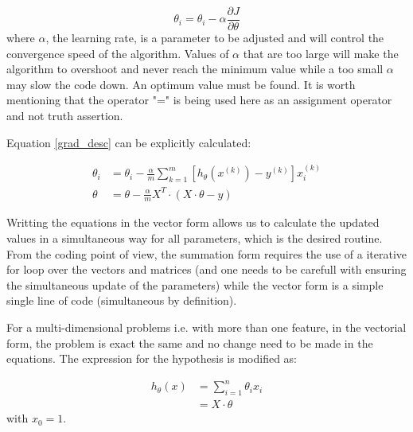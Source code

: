 \begin{equation} \label{grad_desc}
    \theta_{i} = \theta_{i} - \alpha \frac{\partial J}{\partial \theta}
\end{equation}
where $\alpha$, the learning rate, is a parameter to be adjusted and will control the convergence speed of the algorithm. 
Values of $\alpha$ that are too large will make the algorithm to overshoot and never reach the minimum
value while a too small $\alpha$ may slow the code down. An optimum value must be found. It is worth mentioning that the operator "="
is being used here as an assignment operator and not truth assertion.

Equation \ref{grad_desc} can be explicitly calculated:

\begin{equation}
    \begin{split}
        \theta_{i} & = \theta_{i} - \frac{\alpha}{m} \sum _{k=1}^{m} [ h_{\theta}(x^{(k)}) - y^{(k)}] x_{i}^{(k)} \\
                   \theta & = \theta - \frac{\alpha}{m} X^{T} \cdot (X \cdot \theta - y)
    \end{split}
\end{equation}

Writting the equations in the vector form allows us to calculate the updated values in a simultaneous way for all parameters,
which is the desired routine. From the coding point of view, the summation form requires the use of a iterative for loop over the 
vectors and matrices (and one needs to be carefull with ensuring the simultaneous update of the parameters) while the vector form is a simple single line of code (simultaneous by definition).

For a multi-dimensional problems i.e. with more than one feature, in the vectorial form, the problem is exact the same and no change need 
to be made in the equations. The expression for the hypothesis is modified as:

\begin{equation}
    \begin{split}
        h_{\theta}(x) & = \sum_{i=1}^{n} \theta_{i} x_{i} \\
                        & = X \cdot \theta
    \end{split}
\end{equation}
with $x_{0} = 1$.